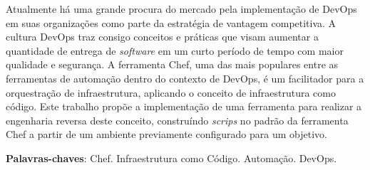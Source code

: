 \newpage\null\thispagestyle{empty}\newpage
\begin{resumo}
  Atualmente há uma grande procura do mercado pela implementação de
  DevOps em suas organizações como parte da estratégia de vantagem
  competitiva. A cultura DevOps traz consigo conceitos e práticas
  que visam aumentar a quantidade de entrega de \textit{software} em um
  curto período de tempo com maior qualidade e segurança. A
  ferramenta Chef, uma das mais populares entre as ferramentas de
  automação dentro do contexto de DevOps, é um facilitador para
  a orquestração de infraestrutura, aplicando o conceito de
  infraestrutura como código. Este trabalho propõe a implementação
  de uma ferramenta para realizar a engenharia reversa deste conceito,
  construíndo \textit{scrips} no padrão da ferramenta Chef a partir de um ambiente
  previamente configurado para um objetivo.

  \vspace{\onelineskip}
  \noindent
   \textbf{Palavras-chaves}: Chef. Infraestrutura como Código. Automação. DevOps.
\end{resumo}
